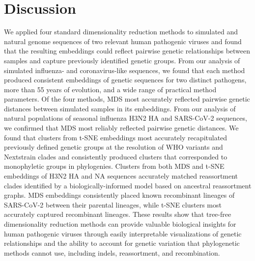 \documentclass[10pt,letterpaper]{article}
\begin{document}
\section*{Discussion}

We applied four standard dimensionality reduction methods to simulated and natural genome sequences of two relevant human pathogenic viruses and found that the resulting embeddings could reflect pairwise genetic relationships between samples and capture previously identified genetic groups.
From our analysis of simulated influenza- and coronavirus-like sequences, we found that each method produced consistent embeddings of genetic sequences for two distinct pathogens, more than 55 years of evolution, and a wide range of practical method parameters.
Of the four methods, MDS most accurately reflected pairwise genetic distances between simulated samples in its embeddings.
From our analysis of natural populations of seasonal influenza H3N2 HA and SARS-CoV-2 sequences, we confirmed that MDS most reliably reflected pairwise genetic distances.
We found that clusters from t-SNE embeddings most accurately recapitulated previously defined genetic groups at the resolution of WHO variants and Nextstrain clades and consistently produced clusters that corresponded to monophyletic groups in phylogenies.
Clusters from both MDS and t-SNE embeddings of H3N2 HA and NA sequences accurately matched reassortment clades identified by a biologically-informed model based on ancestral reassortment graphs.
MDS embeddings consistently placed known recombinant lineages of SARS-CoV-2 between their parental lineages, while t-SNE clusters most accurately captured recombinant lineages.
These results show that tree-free dimensionality reduction methods can provide valuable biological insights for human pathogenic viruses through easily interpretable visualizations of genetic relationships and the ability to account for genetic variation that phylogenetic methods cannot use, including indels, reassortment, and recombination.
\end{document}
